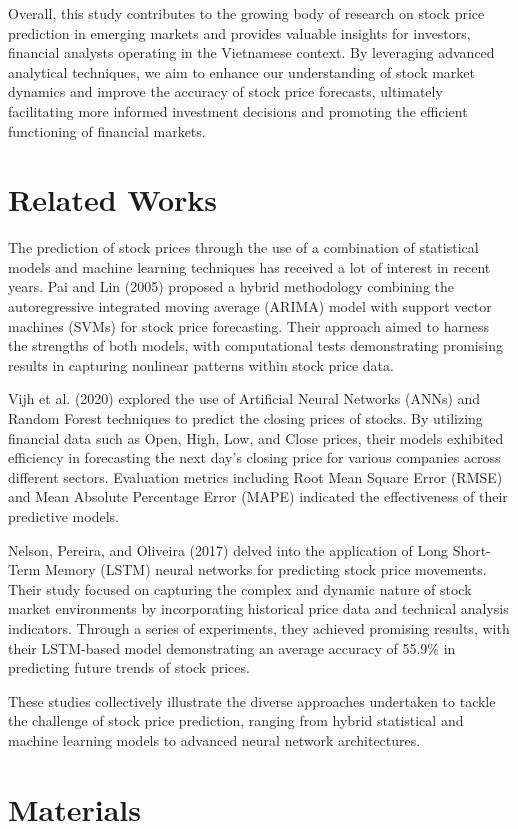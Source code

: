 \documentclass{ieeeojies}
\begin{document}
Overall, this study contributes to the growing body of research on stock price prediction in emerging markets and provides valuable insights for investors, financial analysts operating in the Vietnamese context. By leveraging advanced analytical techniques, we aim to enhance our understanding of stock market dynamics and improve the accuracy of stock price forecasts, ultimately facilitating more informed investment decisions and promoting the efficient functioning of financial markets.
\section{Related Works}
The prediction of stock prices through the use of a combination of statistical models and machine learning techniques has received a lot of interest in recent years. Pai and Lin (2005) \cite{b1} proposed a hybrid methodology combining the autoregressive integrated moving average (ARIMA) model with support vector machines (SVMs) for stock price forecasting. Their approach aimed to harness the strengths of both models, with computational tests demonstrating promising results in capturing nonlinear patterns within stock price data.

Vijh et al. (2020) \cite{b2} explored the use of Artificial Neural Networks (ANNs) and Random Forest techniques to predict the closing prices of stocks. By utilizing financial data such as Open, High, Low, and Close prices, their models exhibited efficiency in forecasting the next day's closing price for various companies across different sectors. Evaluation metrics including Root Mean Square Error (RMSE) and Mean Absolute Percentage Error (MAPE) indicated the effectiveness of their predictive models.

Nelson, Pereira, and Oliveira (2017) \cite{b3} delved into the application of Long Short-Term Memory (LSTM) neural networks for predicting stock price movements. Their study focused on capturing the complex and dynamic nature of stock market environments by incorporating historical price data and technical analysis indicators. Through a series of experiments, they achieved promising results, with their LSTM-based model demonstrating an average accuracy of 55.9\% in predicting future trends of stock prices.

These studies collectively illustrate the diverse approaches undertaken to tackle the challenge of stock price prediction, ranging from hybrid statistical and machine learning models to advanced neural network architectures.
\section{Materials}
\end{document}
